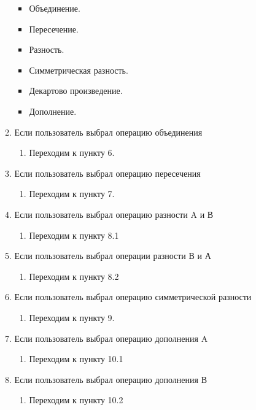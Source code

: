 \documentclass[a4paper,12pt]{extarticle}
\begin{document}
\begin{enumerate}
\begin{enumerate}[label*=\arabic*.]
    \begin{itemize}
      \item Объединение.
      \item Пересечение.
      \item Разность.
      \item Симметрическая разность.
      \item Декартово произведение.
      \item Дополнение.
    \end{itemize}
    \item Если пользователь выбрал операцию объединения
    \begin{enumerate}[label*=\arabic*.]
      \item Переходим к пункту 6.
    \end{enumerate}
    \item Если пользователь выбрал операцию пересечения
    \begin{enumerate}[label*=\arabic*.]
      \item Переходим к пункту 7.
    \end{enumerate}
    \item Если пользователь выбрал операцию разности A и В
    \begin{enumerate}[label*=\arabic*.]
      \item Переходим к пункту 8.1
    \end{enumerate}
    \item Если пользователь выбрал операции разности В и А
    \begin{enumerate}[label*=\arabic*.]
      \item Переходим к пункту 8.2
    \end{enumerate}
    \item Если пользователь выбрал операцию симметрической разности
    \begin{enumerate}[label*=\arabic*.]
      \item Переходим к пункту 9.
    \end{enumerate}
    \item Если пользователь выбрал операцию дополнения A
    \begin{enumerate}[label*=\arabic*.]
      \item Переходим к пункту 10.1
    \end{enumerate}
    \item Если пользователь выбрал операцию дополнения В
    \begin{enumerate}[label*=\arabic*.]
      \item Переходим к пункту 10.2

\end{enumerate}
\end{enumerate}
\end{enumerate}
\end{document}
